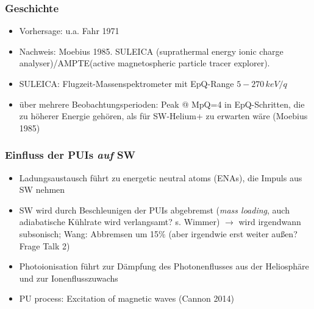 \documentclass[]{article}
\begin{document}
\subsubsection{Geschichte}
\begin{itemize}
	\item Vorhersage: u.a. Fahr 1971
	\item Nachweis: Moebius 1985. SULEICA (suprathermal energy ionic charge analyser)/AMPTE(active magnetospheric particle tracer explorer).
	\item SULEICA: Flugzeit-Massenspektrometer mit EpQ-Range $5-270\,keV/q$
	\item über mehrere Beobachtungsperioden: Peak @ MpQ=4 in EpQ-Schritten, die zu höherer Energie gehören, als für SW-Helium+ zu erwarten wäre (Moebius 1985)
\end{itemize}
\subsubsection{Einfluss der PUIs \textit{auf} SW}
\begin{itemize}
	\item Ladungsaustausch führt zu energetic neutral atoms (ENAs), die Impuls aus SW nehmen
	\item SW wird durch Beschleunigen der PUIs abgebremst (\textit{mass loading}, auch adiabatische Kühlrate wird verlangsamt? s. Wimmer) $\rightarrow$ wird irgendwann subsonisch; Wang: Abbremsen um 15$\%$ (aber irgendwie erst weiter außen? Frage Talk 2)
	\item Photoionisation führt zur Dämpfung des Photonenflusses aus der Heliosphäre und zur Ionenflusszuwachs
	\item PU process: Excitation of magnetic waves (Cannon 2014)
\end{itemize}
\end{document}

